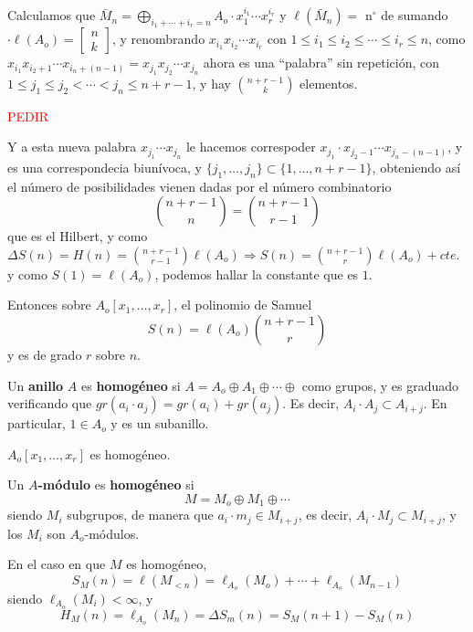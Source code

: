 \begin{dem}
    Calculamos que $\bar M_n = \displaystyle \bigoplus_{i_1+ \cdots+ i_r=n}A_o \cdot x_1^{i_1}\cdots x_r^{i_r}$ y $\ell(\bar M_n) = $ n$^{\circ}$ de sumando $\cdot \ell(A_o) = \left[\begin{smallmatrix} n \\ k \end{smallmatrix}\right]$,  y renombrando $x_{i_1} x_{i_2} \cdots x_{i_r}$ con $1\le i_1 \le i_2 \le \cdots \le i_r \le n$, como $x_{i_1} x_{i_2+1}\cdots x_{i_n+(n-1)} = x_{j_1} x_{j_2} \cdots x_{j_n}$ ahora es una ``palabra'' sin repetici\'on, con $1\le j_1 \le j_2 < \cdots < j_n \le n+r-1$, y hay $\binom{n+r-1}{k}$ elementos.

    \textcolor{red}{PEDIR}

    Y a esta nueva palabra $x_{j_1} \cdots x_{j_n}$ le hacemos correspoder $x_{j_1} \cdot x_{j_2 -1} \cdots x_{j_n-(n-1)}$, y es una correspondecia biun\'ivoca, y $\{j_1, \ldots, j_n\} \subset \{1, \ldots, n+r-1\}$, obteniendo as\'i el n\'umero de posibilidades vienen dadas por el n\'umero combinatorio
    $$\binom{n+r-1}{n} = \binom{n+r-1}{r-1}$$
    que es el Hilbert, y como $\Delta S(n) = H(n) = \binom{n+r-1}{r-1}\ell(A_o) \Rightarrow S(n) = \binom{n+r-1}{r} \ell(A_o) + cte.$ y como $S(1)=\ell(A_o)$, podemos hallar la constante que es $1$.
\end{dem}
\begin{cor}
    Entonces sobre $A_o[x_1,\ldots, x_r]$, el polinomio de Samuel
    $$S(n) = \ell(A_o) \binom{n+r-1}{r}$$
    y es de grado $r$ sobre $n$.
\end{cor}
\begin{defi}
    Un \textbf{anillo} $A$ es \textbf{homog\'eneo} si $A= A_o\oplus A_1\oplus \cdots \oplus $ como grupos, y es graduado verificando que $gr(a_i\cdot a_j) = gr(a_i) + gr(a_j)$. Es decir, $A_i \cdot A_j \subset A_{i+j}$. En particular, $1\in A_o$ y es un subanillo.
\end{defi}
\begin{ejem}
    $A_o[x_1, \ldots, x_r]$ es homog\'eneo.
\end{ejem}
\begin{defi}
    Un \textbf{$A$-m\'odulo} es \textbf{homog\'eneo} si 
    $$M=M_o\oplus M_1\oplus \cdots$$
    siendo $M_i$ subgrupos, de manera que $a_i \cdot m_j \in M_{i+j}$, es decir, $A_i \cdot M_j \subset M_{i+j}$, y los $M_i$ son $A_o$-m\'odulos.
\end{defi}
\begin{ejem}
    En el caso en que $M$ es homog\'eneo,
    $$S_M(n) = \ell(M_{<n}) = \ell_{A_o}(M_o)+ \cdots + \ell_{A_o}(M_{n-1})$$
    siendo $\ell_{A_o}(M_i) < \infty$, y 
    $$H_M(n) = \ell_{A_o}(M_n) = \Delta S_m(n) = S_M(n+1) - S_M(n)$$
\end{ejem}
